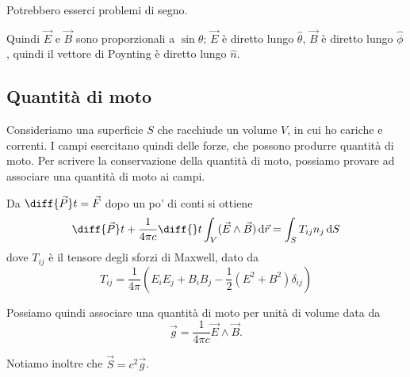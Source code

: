 \documentclass[a4paper,10pt,oneside]{math_article}
\begin{document}
			Potrebbero esserci problemi di segno.

			Quindi $\vec E$ e $\vec B$ sono proporzionali a $\sin \theta$; $\vec E$ è diretto lungo $\hat \theta$, $\vec B$ è diretto lungo $\hat \phi$, quindi il vettore di Poynting è diretto lungo $\hat n$.
			
		\subsection{Quantità di moto}
			Consideriamo una superficie $S$ che racchiude un volume $V$, in cui ho cariche e correnti. I campi esercitano quindi delle forze, che possono produrre quantità di moto. Per scrivere la conservazione della quantità di moto, possiamo provare ad associare una quantità di moto ai campi.
			
			Da $\diff {\vec P}t = \vec F$  dopo un po' di conti si ottiene 
			\begin{equation}
					\diff {\vec P}t + \frac1{4\pi c}\diff{}t \int_V (\vec E \wedge \vec B) \de\vec r = \int_S T_{ij}n_j \de S
			\end{equation}
			dove $T_{ij}$ è il tensore degli sforzi di Maxwell, dato da 
			\begin{equation}
				T_{ij} = \frac1{4\pi} \left(E_iE_j+B_iB_j - \frac12 (E^2 + B^2) \delta_{ij}\right)
			\end{equation}
			
			Possiamo quindi associare una quantità di moto per unità di volume data da 
			\begin{equation}
				\vec g = \frac1{4	\pi c} \vec E \wedge \vec B.
			\end{equation}
			
			Notiamo inoltre che $\vec S = c^2 \vec g$.			

		
\end{document}
